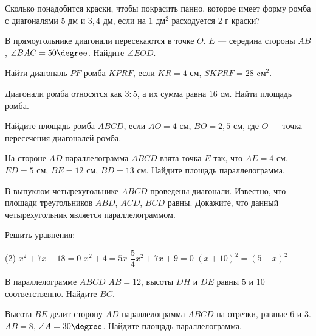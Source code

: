 \begin{class}[number=6]
	\begin{listofex}
		\item Сколько понадобится краски, чтобы покрасить панно, которое имеет форму ромба с диагоналями \( 5 \) дм и \( 3,4 \) дм, если на \( 1 \) дм\( ^2 \) расходуется \( 2 \) г краски?
		\item В прямоугольнике диагонали пересекаются в точке \( O \). \( E \) --- середина стороны \( AB \), \( \angle BAC=50\degree \). Найдите \( \angle EOD \).
		\item Найти диагональ \( PF \) ромба \( KPRF \), если \( KR =4 \) см, \( S KPRF=28 \) cм\( ^2 \).
		\item Диагонали ромба относятся как \( 3:5 \), а их сумма равна \( 16 \) см. Найти площадь ромба.
		\item Найдите  площадь ромба  \( ABCD \), если \( AO = 4  \) см, \( BO = 2,5 \) см, где  \( O \) --- точка пересечения диагоналей ромба.
		\item На стороне \( AD \) параллелограмма \( ABCD \) взята точка \( E \) так, что \( AE = 4 \) см, \( ED = 5 \) см, \( BE = 12 \) см, \( BD = 13 \) см. Найдите площадь параллелограмма.
		\item В выпуклом четырехугольнике \( ABCD \) проведены диагонали. Известно, что площади треугольников \( ABD \), \( ACD \), \( BCD \) равны. Докажите, что данный четырехугольник является параллелограммом.
	\end{listofex}
\end{class}

\begin{homework}[number=3]
	\begin{listofex}
		\item Решить уравнения:
		\begin{tasks}(2)
			\task \( x^2+7x-18=0 \)
			\task \( x^2+4=5x \)
			\task \( \dfrac{5}{4}x^2+7x+9=0 \)
			\task \( (x+10)^2=(5-x)^2 \)
		\end{tasks}
		 \item В параллелограмме \( ABCD \) \( AB=12 \), высоты \( DH \) и \( DE \) равны \( 5 \) и \( 10 \) соответственно. Найдите \( BC \).
		 \item Высота \( BE \) делит сторону \( AD \) параллелограмма \( ABCD \) на отрезки, равные \( 6 \) и \( 3 \). \( AB=8 \), \( \angle A=30\degree \). Найдите площадь параллелограмма.
	\end{listofex}
\end{homework}

